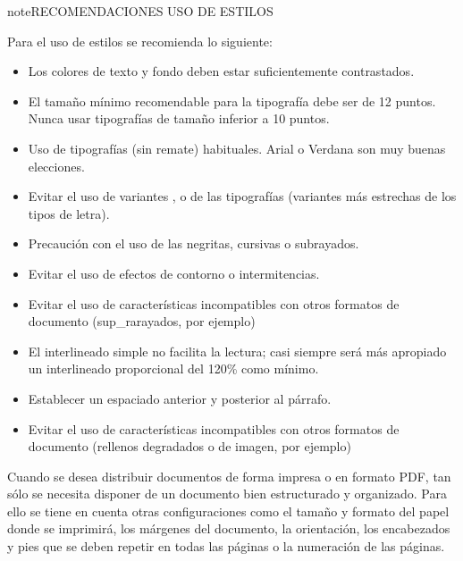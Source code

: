 \documentclass[letterpaper,10pt,spanish]{sphinxmanual}
\begin{document}
\begin{sphinxadmonition}{note}{RECOMENDACIONES USO DE ESTILOS}

\sphinxAtStartPar
Para el uso de estilos se recomienda lo siguiente:
\begin{itemize}
\item {} 
\sphinxAtStartPar
Los colores de texto y fondo deben estar suficientemente contrastados.

\item {} 
\sphinxAtStartPar
El tamaño mínimo recomendable para la tipografía debe ser de 12 puntos. Nunca usar
tipografías de tamaño inferior a 10 puntos.

\item {} 
\sphinxAtStartPar
Uso de tipografías  (sin remate) habituales. Arial o Verdana son muy buenas elecciones.

\item {} 
\sphinxAtStartPar
Evitar el uso de variantes ,  o  de las tipografías (variantes más estrechas de los tipos de letra).

\item {} 
\sphinxAtStartPar
Precaución con el uso de las negritas, cursivas o subrayados.

\item {} 
\sphinxAtStartPar
Evitar el uso de efectos de contorno o intermitencias.

\item {} 
\sphinxAtStartPar
Evitar el uso de características incompatibles con otros formatos de documento (sup\_rarayados, por ejemplo)

\item {} 
\sphinxAtStartPar
El interlineado simple no facilita la lectura; casi siempre será más apropiado un interlineado
proporcional del 120\% como mínimo.

\item {} 
\sphinxAtStartPar
Establecer un espaciado anterior y posterior al párrafo.

\item {} 
\sphinxAtStartPar
Evitar el uso de características incompatibles con otros formatos de documento (rellenos
degradados o de imagen, por ejemplo)

\end{itemize}
\end{sphinxadmonition}

\sphinxAtStartPar
Cuando se desea distribuir documentos de forma impresa o en formato PDF, tan sólo se necesita disponer de un documento bien estructurado y organizado. Para ello se tiene en cuenta otras configuraciones como el tamaño y formato del papel donde se imprimirá, los márgenes del documento, la orientación, los encabezados y pies que se deben repetir en todas las páginas o la numeración de las páginas.
\end{document}
